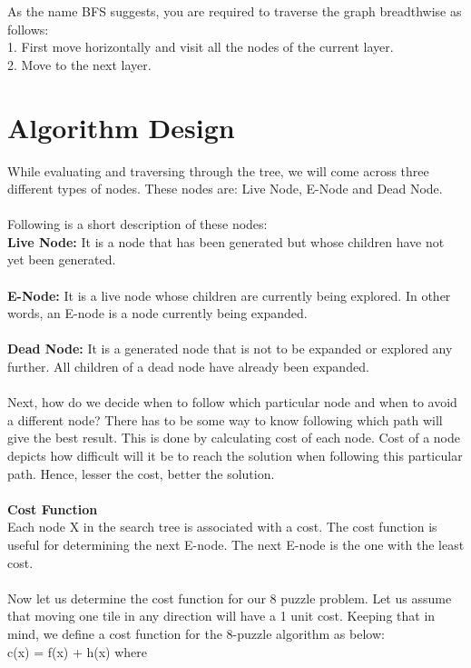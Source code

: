 \documentclass[conference]{IEEEtran}
\begin{document}
As the name BFS suggests, you are required to traverse the graph breadthwise as follows:\\
1. First move horizontally and visit all the nodes of the current layer.\\
2. Move to the next layer.

\section{Algorithm Design}
While evaluating and traversing through the tree, we will come across three different types of nodes. These nodes are: Live Node, E-Node and Dead Node.\\\\
Following is a short description of these nodes:\\
\textbf{Live Node: } It is a node that has been generated but whose children have not yet been generated. \\\\
\textbf{E-Node: } It is a live node whose children are currently being explored. In other words, an E-node is a node currently being expanded.  \\\\
\textbf{Dead Node: } It is a generated node that is not to be expanded or explored any further. All children of a dead node have already been expanded. \\\\
Next, how do we decide when to follow which particular node and when to avoid a different node? There has to be some way to know following which path will give the best result. This is done by calculating cost of each node. Cost of a node depicts how difficult will it be to reach the solution when following this particular path. Hence, lesser the cost, better the solution.\\\\
\textbf{Cost Function }\\Each node X in the search tree is associated with a cost. The cost function is useful for determining the next E-node. The next E-node is the one with the least cost.\\
\\

Now let us determine the cost function for our 8 puzzle problem. Let us assume that moving one tile in any direction will have a 1 unit cost. Keeping that in mind, we define a cost function for the 8-puzzle algorithm as below: \\

c(x) = f(x) + h(x) where\\\\
\end{document}
